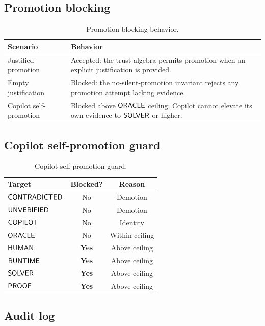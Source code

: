 \documentclass[11pt]{article}
\begin{document}
\subsection{Promotion blocking}\label{sec:eval-promo}

\begin{table}[t]
\centering
\caption{Promotion blocking behavior.}
\label{tab:promotion-blocking}
\begin{tabular}{@{}lp{8cm}@{}}
\toprule
\textbf{Scenario} & \textbf{Behavior} \\
\midrule
Justified promotion & Accepted: the trust algebra permits promotion
  when an explicit justification is provided. \\
Empty justification & Blocked: the no-silent-promotion invariant
  rejects any promotion attempt lacking evidence. \\
Copilot self-promotion & Blocked above $\mathsf{ORACLE}$ ceiling: Copilot
  cannot elevate its own evidence to $\mathsf{SOLVER}$ or higher. \\
\bottomrule
\end{tabular}
\end{table}

\subsection{Copilot self-promotion guard}\label{sec:eval-copilot}

\begin{table}[t]
\centering
\caption{Copilot self-promotion guard.}
\label{tab:copilot-guard}
\begin{tabular}{@{}lcc@{}}
\toprule
\textbf{Target} & \textbf{Blocked?} & \textbf{Reason} \\
\midrule
$\mathsf{CONTRADICTED}$ & No & Demotion \\
$\mathsf{UNVERIFIED}$ & No & Demotion \\
$\mathsf{COPILOT}$ & No & Identity \\
$\mathsf{ORACLE}$ & No & Within ceiling \\
$\mathsf{HUMAN}$ & \textbf{Yes} & Above ceiling \\
$\mathsf{RUNTIME}$ & \textbf{Yes} & Above ceiling \\
$\mathsf{SOLVER}$ & \textbf{Yes} & Above ceiling \\
$\mathsf{PROOF}$ & \textbf{Yes} & Above ceiling \\
\bottomrule
\end{tabular}
\end{table}

\subsection{Audit log}\label{sec:eval-audit}
\end{document}
